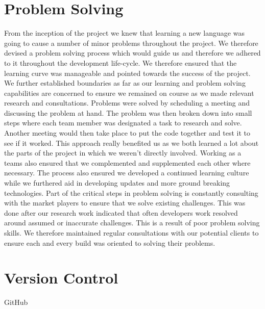 \section{Problem Solving}

From the inception of the project we knew that learning a new language was going to cause a number of minor problems throughout the project. We therefore devised a problem solving process which would guide us and therefore we adhered to it throughout the development life-cycle. We therefore ensured that the learning curve was manageable and pointed towards the success of the project. We further established boundaries as far as our learning and problem solving capabilities are concerned to ensure we remained on course as we made relevant research and consultations. 
\newline
\newline
Problems were solved by scheduling a meeting and discussing the problem at hand. The problem was then broken down into small steps where each team member was designated a task to research and solve. Another meeting would then take place to put the code together and test it to see if it worked. This approach really benefited us as we both learned a lot about the parts of the project in which we weren't directly involved. Working as a teams also ensured that we complemented and supplemented each other where necessary. The process also ensured we developed a continued learning culture while we furthered aid in developing updates and more ground breaking technologies. 
\newline
\newline
Part of the critical steps in problem solving is constantly consulting with the market players to ensure that we solve existing challenges. This was done after our research work indicated  that often developers work resolved around assumed or inaccurate challenges. This is a result of poor problem solving skills. We therefore maintained regular consultations with our potential clients to ensure each and every build was oriented to solving their problems. 


\section{Version Control}

GitHub

